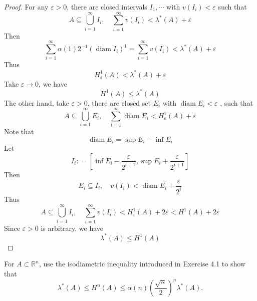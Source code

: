 \documentclass[../main.tex]{subfiles}
\begin{document}
\begin{proof}
    For any \(   \varepsilon > 0  \), there are closed intervals \(  I_1,\cdots   \) with \(  v\left( I_{i} \right)<  \varepsilon    \) such that \[
    A\subseteq \bigcup _{i = 1}^{\infty}I_{i},\quad \sum _{i= 1}^{\infty}v\left( I_{i} \right)<  \lambda ^{*}\left( A \right)+  \varepsilon   
    \]   Then \[
    \sum _{i= 1}^{\infty} \alpha \left( 1 \right)2^{-1} \left( \operatorname{diam}I_{i}  \right)^{1}= \sum _{i= 1}^{\infty}v\left( I_{i} \right)<  \lambda ^{*}\left( A \right)+  \varepsilon    
    \] Thus \[
    H_{ \varepsilon }^{1}\left( A \right) <  \lambda ^{*}\left( A \right)+  \varepsilon   
    \] Take \(   \varepsilon \to 0  \), we have \[
    H^{1}\left( A \right)\le   \lambda ^{*}\left( A \right)  
    \] 
    The other hand, take \(   \varepsilon > 0  \),  there are closed set \(  E_{i}  \) with \(  \operatorname{diam}E_{i}<  \varepsilon   \) , such that \[
    A\subseteq \bigcup _{i= 1}^{\infty}E_{i},\quad \sum _{i= 1}^{\infty} \operatorname{diam}E_{i}<  H^{1}_{ \varepsilon }\left( A \right) +  \varepsilon  
    \]  Note that \[
    \operatorname{diam}E_{i}=  \sup E_{i}-\inf E_{i}
    \]Let \[
    I_{i} : =  \left[\inf E_{i}-\frac{ \varepsilon  }{2^{i+ 1} }, \sup E_{i}+ \frac{ \varepsilon  }{2^{i+ 1} }   \right]
    \] Then \[
    E_{i}\subseteq I_{i},\quad  v\left( I_{i} \right)<  \operatorname{diam}E_{i}+ \frac{ \varepsilon  }{2^{i} } 
    \] Thus \[
    A\subseteq \bigcup _{i = 1}^{\infty}I_{i},\quad \sum _{i= 1}^{\infty}v\left( I_{i} \right) <  H^{1}_{ \varepsilon }\left( A \right)  + 2 \varepsilon < H^{1}\left( A \right)+ 2 \varepsilon  
    \] Since \(   \varepsilon > 0  \) is arbitrary,  we have \[
     \lambda ^{*}\left( A \right)\le  H^{1}\left( A \right)  
    \] 
\end{proof}
\begin{exercise}{}{}
For $A \subset \mathbb{R}^n$, use the isodiametric inequality introduced in Exercise 4.1 to show that
\[
\lambda^*(A) \le H^n(A) \le \alpha(n) \left(\frac{\sqrt{n}}{2}\right)^n \lambda^*(A).
\]
\end{exercise}
\end{document}
